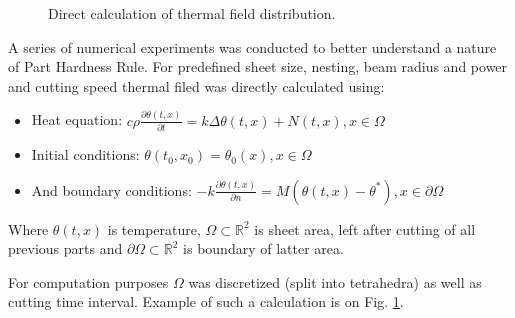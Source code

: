 \documentclass{../download/tPRS2e}
\begin{document}
\begin{figure}
\begin{center}
\caption{Direct calculation of thermal field distribution.}\label{thermal}
\end{center}
\end{figure}

A series of numerical experiments was conducted to better understand a nature of Part Hardness Rule.
For predefined sheet size, nesting, beam radius and power and cutting speed thermal filed was directly calculated using:

\begin{itemize}
\item Heat equation: $c \rho \frac{\partial \theta (t, x)}{\partial t} = k \Delta \theta(t ,x) + N(t, x), x \in \Omega$
\item Initial conditions: $\theta(t_0, x_0) = \theta_0(x), x \in \Omega$
\item And boundary conditions: $-k \frac{\partial \theta(t, x)}{\partial n} = M(\theta(t, x) - \theta^*), x \in \partial \Omega$
\end{itemize}

Where $\theta(t, x)$ is temperature,
$\Omega \subset \mathbb{R}^2$ is sheet area, left after cutting of all previous parts and
$\partial \Omega \subset \mathbb{R}^2$ is boundary of latter area.

For computation purposes $\Omega$ was discretized (split into tetrahedra)
as well as cutting time interval.
Example of such a calculation is on Fig. \ref{thermal}.
\end{document}
